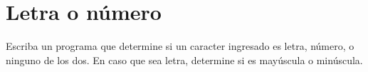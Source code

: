\section{Letra o número}

Escriba un programa que determine si un caracter ingresado es letra,
número, o ninguno de los dos. En caso que sea letra, determine si es
mayúscula o minúscula.
